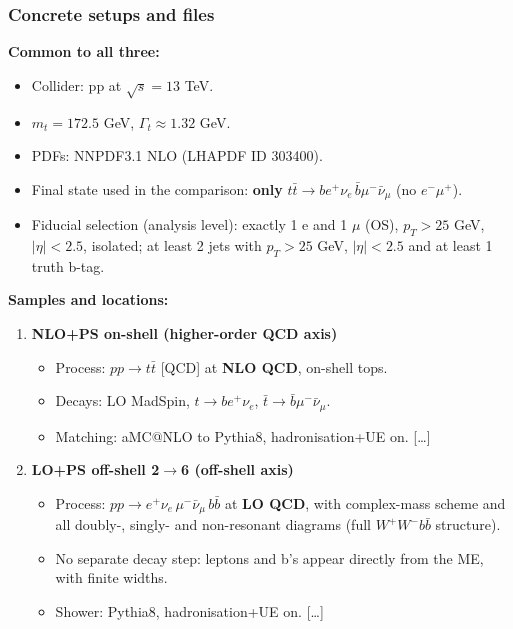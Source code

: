 \documentclass[submission, Phys]{SciPost}
\begin{document}
\begin{promptblock}
\subsubsection*{Concrete setups and files}

\textbf{Common to all three:}
\begin{itemize}
  \item Collider: pp at $\sqrt{s}=13$ TeV.
  \item $m_t = 172.5$ GeV, $\Gamma_t \approx 1.32$ GeV.
  \item PDFs: NNPDF3.1 NLO (LHAPDF ID 303400).
  \item Final state used in the comparison: \textbf{only} $t\bar t\to b e^+\nu_e\, \bar b \mu^-\bar\nu_\mu$ (no $e^-\mu^+$).
  \item Fiducial selection (analysis level): exactly 1 e and 1 $\mu$ (OS), $p_T>25$ GeV, $|\eta|<2.5$, isolated; at least 2 jets with $p_T>25$ GeV, $|\eta|<2.5$ and at least 1 truth b-tag.
\end{itemize}

\textbf{Samples and locations:}

\begin{enumerate}
  \item \textbf{NLO+PS on-shell (higher-order QCD axis)}
  \begin{itemize}
    \item Process: $pp \to t\bar t$ [QCD] at \textbf{NLO QCD}, on-shell tops.
    \item Decays: LO MadSpin, $t\to b e^+\nu_e$, $\bar t\to \bar b\mu^-\bar\nu_\mu$.
    \item Matching: aMC@NLO to Pythia8, hadronisation+UE on. [\ldots]
  \end{itemize}

  \item \textbf{LO+PS off-shell 2$\to$6 (off-shell axis)}
  \begin{itemize}
    \item Process: $pp \to e^+\nu_e\,\mu^-\bar\nu_\mu\,b\bar b$ at \textbf{LO QCD}, with complex-mass scheme and all doubly-, singly- and non-resonant diagrams (full $W^+W^-b\bar b$ structure).
    \item No separate decay step: leptons and b’s appear directly from the ME, with finite widths.
    \item Shower: Pythia8, hadronisation+UE on. [\ldots]
  \end{itemize}


\end{enumerate}
\end{promptblock}
\end{document}
